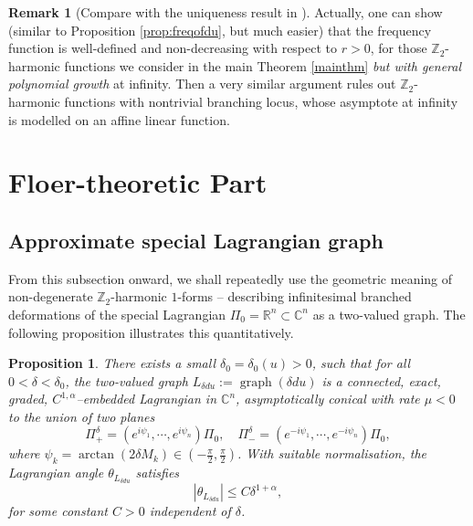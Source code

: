 \documentclass[11pt,a4paper]{article}
\numberwithin{equation}{section}%
\newtheorem{prop}[thm]{Proposition}
\theoremstyle{definition}
\newtheorem{rmk}[thm]{Remark}
\newcommand{\R}{\mathbb{R}}
\newcommand{\C}{\mathbb{C}}
\newcommand{\Z}{\mathbb{Z}}
\begin{document}
\begin{rmk}[Compare with the uniqueness result in \cite{Sun-Pell,Haydys-Mazzeo-Takahashi-Examples}]
    Actually, one can show (similar to Proposition \ref{prop:freqofdu}, but much easier) that the frequency function is well-defined and non-decreasing with respect to $r>0$, for those $\Z_2$-harmonic functions we consider in the main Theorem \ref{mainthm} \textit{but with general polynomial growth} at infinity. 
    Then a very similar argument rules out $\Z_2$-harmonic functions with nontrivial branching locus, whose asymptote at infinity is modelled on an affine linear function.
    
    

\end{rmk}
\section{Floer-theoretic Part}
\label{Sec:floer-theory}
\subsection{Approximate special Lagrangian graph} 
From this subsection onward, we shall repeatedly use the geometric meaning of non-degenerate $\Z_2$-harmonic $1$-forms -- describing infinitesimal branched deformations of the special Lagrangian $\Pi_0=\R^n\subset \C^n$ as a two-valued graph. The following proposition illustrates this quantitatively. 


\begin{prop}\label{prop:appslag}
    There exists a small $\delta_0=\delta_0(u)>0$, such that for all $0<\delta<\delta_0$, the two-valued graph $L_{\delta du}:=\operatorname{graph}(\delta du)$ is a connected,  exact, graded, $C^{1,\alpha}$--embedded Lagrangian in $\C^n$, asymptotically conical with rate $\mu<0$ to the union of two planes 
    $$\Pi^\delta_+=(e^{i\psi_1},\cdots,e^{i\psi_n})\Pi_0,\quad \Pi^\delta_-=(e^{-i\psi_1},\cdots,e^{-i\psi_n})\Pi_0,$$
    where $\psi_k=\arctan (2\delta M_k)\in (-\frac{\pi}{2},\frac{\pi}{2})$. With suitable normalisation, the Lagrangian angle $\theta_{L_{\delta du}}$ satisfies 
    \begin{equation}
        \label{eqn:estgrad}
        |\theta_{L_{\delta du}}|\leqslant C\delta^{1+\alpha},
    \end{equation}
    for some constant $C>0$ \textit{independent} of $\delta$. 
\end{prop}
\end{document}
